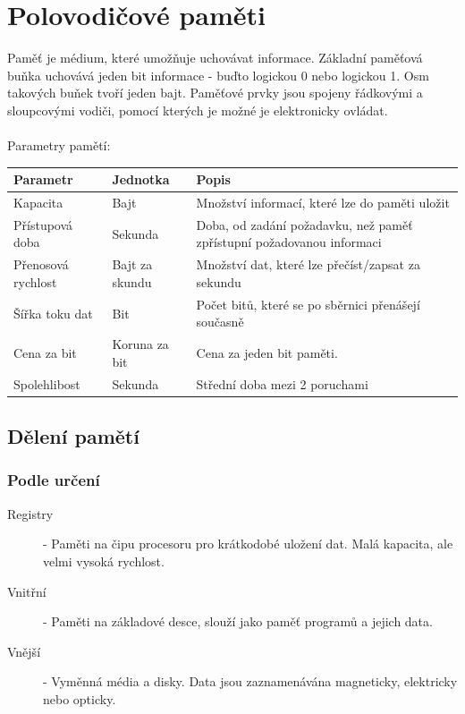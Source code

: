 \section{Polovodičové paměti}
\label{sec:polpameti}
Paměť je médium, které umožňuje uchovávat informace.
Základní paměťová buňka uchovává jeden bit informace - buďto logickou 0 nebo logickou 1.
Osm takových buňek tvoří jeden bajt.
Paměťové prvky jsou spojeny řádkovými a sloupcovými vodiči, pomocí kterých je možné je elektronicky ovládat.\\ \\
Parametry pamětí: \\
\begin{tabularx}{\linewidth}{l|l|l}
  \textbf{Parametr}  & \textbf{Jednotka} & \textbf{Popis}                                                        \\
  \hline
  Kapacita           & Bajt              & Množství informací, které lze do paměti uložit                        \\
  \hline
  Přístupová doba    & Sekunda           & Doba, od zadání požadavku, než paměť zpřístupní požadovanou informaci \\
  \hline
  Přenosová rychlost & Bajt za skundu    & Množství dat, které lze přečíst/zapsat za sekundu                     \\
  \hline
  Šířka toku dat     & Bit               & Počet bitů, které se po sběrnici přenášejí současně                   \\
  \hline
  Cena za bit        & Koruna za bit     & Cena za jeden bit paměti.                                             \\
  \hline
  Spolehlibost       & Sekunda           & Střední doba mezi 2 poruchami                                         \\
\end{tabularx}
\subsection{Dělení pamětí}
\subsubsection{Podle určení}
\begin{description}
  \item[Registry] - Paměti na čipu procesoru pro krátkodobé uložení dat.
    Malá kapacita, ale velmi vysoká rychlost.
  \item[Vnitřní] - Paměti na základové desce, slouží jako paměť programů a jejich data.
  \item[Vnější] - Vyměnná média a disky.
    Data jsou zaznamenávána magneticky, elektricky nebo opticky.
\end{description}
